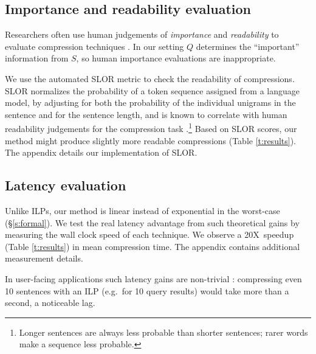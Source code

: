 \documentclass[11pt,a4paper]{article}
\newcommand{\speedup}[0]{20X~}
\begin{document}
\subsection{Importance and readability evaluation}\label{s:readabilityinformativeness}

Researchers often use human judgements of \textit{importance} and \textit{readability} to evaluate compression techniques \cite{Knight2000StatisticsBasedS,filippova2015sentence}. In our setting $Q$ determines the ``important'' information from $S$, so human importance evaluations are inappropriate.

We use the automated SLOR metric \cite{lau2015unsupervised} to check the readability of compressions. SLOR normalizes the probability of a token sequence assigned from a language model, by adjusting for both the probability of the individual unigrams in the sentence and for the sentence length, and is known to correlate with human readability judgements for the compression task \cite{kannConl}.\footnote{Longer sentences are always less probable than shorter sentences; rarer words make a sequence less probable.} Based on SLOR scores, our method might produce slightly more readable compressions (Table \ref{t:results}). The appendix details our implementation of SLOR. 

\subsection{Latency evaluation}\label{s:costs}

Unlike ILPs, our method is linear instead of exponential in the worst-case (\S\ref{s:formal}). We test the real latency advantage from such theoretical gains by measuring the wall clock speed of each technique. We observe a \speedup speedup (Table \ref{t:results}) in mean compression time. The appendix contains additional measurement details.

In user-facing applications such latency gains are non-trivial \cite{Nielsen,heerschei,Liu2014TheEO}: compressing even 10 sentences with an ILP (e.g.\ for 10 query results) would take more than a second, a noticeable lag. %
\end{document}
